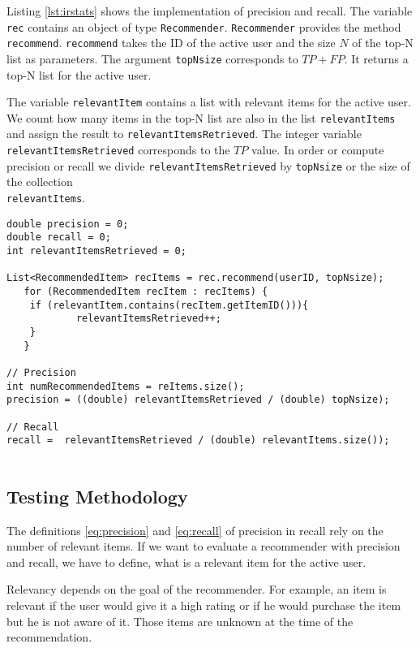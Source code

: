 Listing \ref{lst:irstats} shows the implementation of precision and recall. 
The variable \verb|rec| contains an object of type \verb|Recommender|. \verb|Recommender| provides the method \verb|recommend|. \verb|recommend| takes the ID of the active user and the size $N$ of the top-N list as parameters. The argument \verb|topNsize| corresponds to $TP+FP$. It returns a top-N list for the active user. 

The variable \verb|relevantItem| contains a list with relevant items for the active user.
We count how many items in the top-N list are also in the list \verb|relevantItems| and assign the result to \verb|relevantItemsRetrieved|. The integer variable \verb|relevantItemsRetrieved| corresponds to the $TP$ value. In order or compute precision or recall we divide \verb|relevantItemsRetrieved| by \verb|topNsize| or the size of the collection\\ \verb|relevantItems|.


\begin{lstlisting}[caption=Implementation of precision and recall,label=lst:irstats]
double precision = 0;
double recall = 0;
int relevantItemsRetrieved = 0;

List<RecommendedItem> recItems = rec.recommend(userID, topNsize);
   for (RecommendedItem recItem : recItems) {
	if (relevantItem.contains(recItem.getItemID())){
			relevantItemsRetrieved++;
	}
   }

// Precision
int numRecommendedItems = reItems.size();
precision = ((double) relevantItemsRetrieved / (double) topNsize);
		      
// Recall
recall =  relevantItemsRetrieved / (double) relevantItems.size());
		      
\end{lstlisting}

\subsection{Testing Methodology}
\label{sec:methodology}
The definitions \ref{eq:precision} and \ref{eq:recall} of precision in recall rely on the number of relevant items.
If we want to evaluate a recommender with \gls{precision} and \gls{recall}, we have to define, what is a relevant item for the active user. 

Relevancy depends on the goal of the recommender. For example, an item is relevant if the user would give it a high rating or if he would purchase the item but he is not aware of it.
Those items are unknown at the time of the recommendation. 

